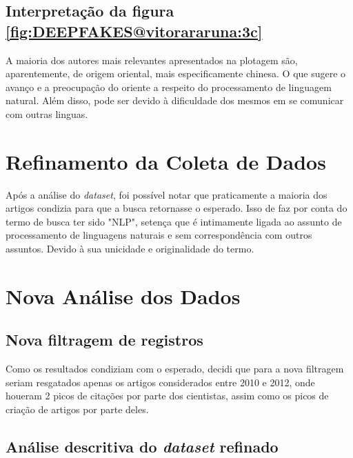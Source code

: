 \subsection{Interpretação da figura \ref{fig:DEEPFAKES@vitorararuna:3c}}
A maioria dos autores mais relevantes apresentados na plotagem são, aparentemente, de origem oriental, mais especificamente chinesa. O que sugere o avanço e a preocupação do oriente a respeito do processamento de linguagem natural. Além disso, pode ser devido à dificuldade dos mesmos em se comunicar com outras linguas.


\section{Refinamento da Coleta de Dados}

Após a análise do \textit{dataset}, foi possível notar que praticamente a maioria dos artigos condizia para que a busca retornasse o esperado. Isso de faz por conta do termo de busca ter sido "NLP", setença que é intimamente ligada ao assunto de processamento de linguagens naturais e sem correspondência com outros assuntos. Devido à sua unicidade e originalidade do termo.

\section{Nova Análise dos Dados}

\subsection{Nova filtragem de registros}

Como os resultados condiziam com o esperado, decidi que para a nova filtragem seriam resgatados apenas os artigos considerados entre 2010 e 2012, onde houeram 2 picos de citações por parte dos cientistas, assim como os picos de criação de artigos por parte deles.


\subsection{Análise descritiva do \textit{dataset} refinado}

